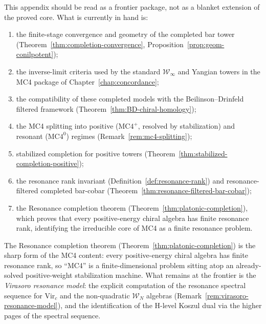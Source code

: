 \begin{remark}\label{rem:nilpotent-main}
This appendix should be read as a frontier package, not as a blanket
extension of the proved core.  What is currently in hand is:
\begin{enumerate}
\item the finite-stage convergence and geometry of the completed bar
      tower
      \textup{(}Theorem~\ref{thm:completion-convergence},
      Proposition~\ref{prop:geom-conilpotent}\textup{)};
\item the inverse-limit criteria used by the standard
      $\mathcal{W}_\infty$ and Yangian towers in the MC4 package of
      Chapter~\ref{chap:concordance};
\item the compatibility of these completed models with the
      Beilinson--Drinfeld filtered framework
      \textup{(}Theorem~\ref{thm:BD-chiral-homology}\textup{)};
\item the MC4 splitting into positive
  \textup{(}$\mathrm{MC4}^+$, resolved by stabilization\textup{)}
  and resonant \textup{(}$\mathrm{MC4}^0$\textup{)} regimes
  \textup{(}Remark~\ref{rem:mc4-splitting}\textup{)};
\item stabilized completion for positive towers
  \textup{(}Theorem~\ref{thm:stabilized-completion-positive}\textup{)};
\item the resonance rank invariant
  \textup{(}Definition~\ref{def:resonance-rank}\textup{)}
  and resonance-filtered completed bar-cobar
  \textup{(}Theorem~\ref{thm:resonance-filtered-bar-cobar}\textup{)};
\item the Resonance completion theorem
  \textup{(}Theorem~\ref{thm:platonic-completion}\textup{)},
  which proves that every positive-energy chiral algebra has
  finite resonance rank, identifying the irreducible core of MC4
  as a finite resonance problem.
\end{enumerate}
The Resonance completion theorem
\textup{(}Theorem~\ref{thm:platonic-completion}\textup{)}
is the sharp form of the MC4 content:
every positive-energy chiral algebra has finite resonance rank,
so ``MC4'' is a finite-dimensional problem sitting atop an
already-solved positive-weight stabilization machine.
What remains at the frontier is the \emph{Virasoro resonance
model}: the explicit computation of the resonance spectral
sequence for $\mathrm{Vir}_c$ and the non-quadratic
$\mathcal{W}_N$ algebras (Remark~\ref{rem:virasoro-resonance-model}),
and the identification of the H-level Koszul dual via
the higher pages of the spectral sequence.
\end{remark}
